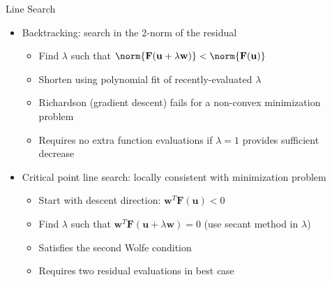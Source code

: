 \documentclass{beamer}
\newcommand{\vu}{\mathbf{u}}
\newcommand{\vw}{\mathbf{w}}
\newcommand{\vF}{\mathbf{F}}
\begin{document}
\begin{frame}{Line Search}
  \begin{itemize}
  \item Backtracking: search in the 2-norm of the residual
    \begin{itemize}
    \item Find $\lambda$ such that $\norm{\vF(\vu + \lambda \vw)} < \norm{\vF(\vu)}$
    \item Shorten using polynomial fit of recently-evaluated $\lambda$
    \item Richardson (gradient descent) fails for a non-convex minimization problem
    \item Requires no extra function evaluations if $\lambda=1$ provides sufficient decrease
    \end{itemize}
  \item Critical point line search: locally consistent with minimization problem
    \begin{itemize}
    \item Start with descent direction: $\vw^T \vF(\vu) < 0$
    \item Find $\lambda$ such that $\vw^T \vF(\vu + \lambda \vw) = 0$ (use secant method in $\lambda$)
    \item Satisfies the second Wolfe condition
    \item Requires two residual evaluations in best case
    \end{itemize}
  \end{itemize}
\end{frame}
\end{document}
